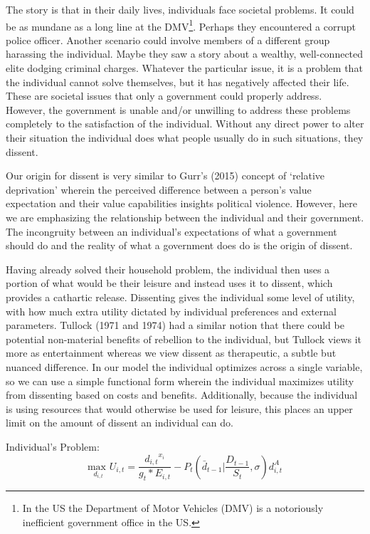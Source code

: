 \documentclass[12pt]{article}
\begin{document}
\begin{spacing}{1.5}
The story is that in their daily lives, individuals face societal problems. It could be as mundane as a long line at the DMV\footnote{In the US the Department of Motor Vehicles (DMV) is a notoriously inefficient government office in the US.}. Perhaps they encountered a corrupt police officer. Another scenario could involve members of a different group harassing the individual. Maybe they saw a story about a wealthy, well-connected elite dodging criminal charges. Whatever the particular issue, it is a problem that the individual cannot solve themselves, but it has negatively affected their life. These are societal issues that only a government could properly address. However, the government is unable and/or unwilling to address these problems completely to the satisfaction of the individual. Without any direct power to alter their situation the individual does what people usually do in such situations, they dissent. 

Our origin for dissent is very similar to Gurr's (2015) concept of `relative deprivation' wherein the perceived difference between a person's value expectation and their value capabilities insights political violence. However, here we are emphasizing the relationship between the individual and their government. The incongruity between an individual's expectations of what a government should do and the reality of what a government does do is the origin of dissent.

Having already solved their household problem, the individual then uses a portion of what would be their leisure and instead uses it to dissent, which provides a cathartic release. Dissenting gives the individual some level of utility, with how much extra utility dictated by individual preferences and external parameters. Tullock (1971 and 1974) had a similar notion that there could be potential non-material benefits of rebellion to the individual, but Tullock views it more as entertainment whereas we view dissent as therapeutic, a subtle but nuanced difference. In our model the individual optimizes across a single variable, so we can use a simple functional form wherein the individual maximizes utility from dissenting based on costs and benefits. Additionally, because the individual is using resources that would otherwise be used for leisure, this places an upper limit on the amount of dissent an individual can do. 

\vspace{.5 em}
\noindent Individual's Problem:
\begin{equation}
{\underset{d_{i,t}}{\text{max }}}  U_{i,t}= \frac{{d_{i,t}}^{{x}_i}}{g_t * E_{i,t}} - P_t \left( \bar{d}_{t-1} \Bigg|\frac{D_{t-1}}{S_t},\sigma \right)d_{i,t}^A
\end{equation}


\end{spacing}
\end{document}
